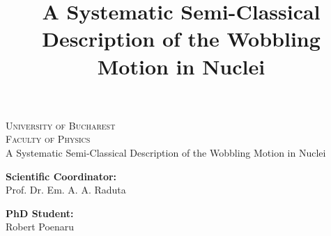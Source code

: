 \documentclass[a4paper, 12pt, oneside]{Thesis}
\begin{document}
\frontmatter
\begin{titlepage}
    \begin{center}
        \textsc{ \LARGE{University of Bucharest \\}}
        \textsc{ \LARGE{Faculty of Physics\\ }}
        \vspace{40mm}
        \textup{\LARGE{A Systematic Semi-Classical Description of the Wobbling Motion in Nuclei}}
    \end{center}
    
    \vspace{25mm}
    
    \begin{minipage}[t]{0.47\textwidth}
        \textnormal{\large{\bf Scientific Coordinator:\\}}
        {\large Prof. Dr. Em. A. A. Raduta}
    \end{minipage}\hfill\begin{minipage}[t]{0.47\textwidth}\raggedleft
        \textnormal{\large{\bf PhD Student:\\}}
        {\large Robert Poenaru}
    \end{minipage}
    
    \vspace{40mm}
    
    
    \vspace{35mm}
    
    \centering{\large{\today}}
\end{titlepage}

\title{A Systematic Semi-Classical Description of the Wobbling Motion in Nuclei}

\end{document}
